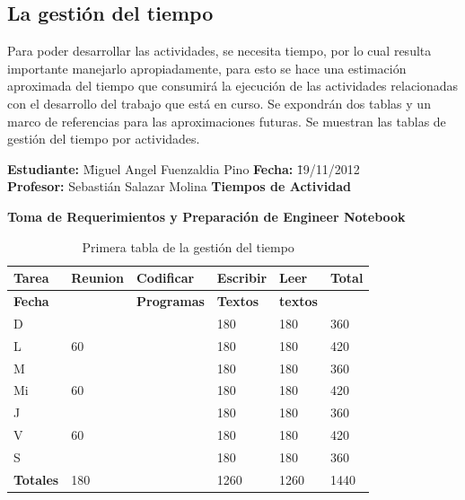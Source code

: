 \documentclass[a4paper,12pt,openany,oneside]{book}
\begin{document}
\subsection{La gestión del tiempo}
Para poder desarrollar las actividades, se necesita tiempo, por lo cual resulta importante manejarlo apropiadamente, para esto se hace una estimación aproximada del tiempo que consumirá la ejecución de las actividades relacionadas con el desarrollo del trabajo que está en curso. Se expondrán dos tablas y un marco de referencias para las aproximaciones futuras. Se muestran las tablas de gestión del tiempo por actividades.
\begin{table}[!ht]
\begin{tabbing}
\textbf{Estudiante:} \= Miguel Angel Fuenzaldia Pino \= \textbf{Fecha:} \= 19/11/2012\\
\textbf{Profesor:} \> Sebastián Salazar Molina \> \textbf{Tiempos de Actividad} \>  \\
\end{tabbing}
\textbf{Toma de Requerimientos y Preparación de Engineer Notebook}\\
\begin{tabular}{| l | l | l | l | l | l |}
\hline
\textbf{Tarea} & \textbf{Reunion} & \textbf{Codificar} & \textbf{Escribir} & \textbf{Leer} & \textbf{Total} \\
\hline
\textbf{Fecha} &                  & \textbf{Programas} & \textbf{Textos} & \textbf{textos} & \\
\hline
D  &    & & 180 & 180 & 360 \\
\hline
L  & 60 & & 180 & 180 & 420 \\
\hline
M  &    & & 180 & 180 & 360 \\
\hline
Mi & 60 & & 180 & 180 & 420 \\
\hline
J  &    & & 180 & 180 & 360 \\
\hline
V  & 60 & & 180 & 180 & 420 \\
\hline
S  &    & & 180 & 180 & 360 \\
\hline
\textbf{Totales} & 180 & & 1260 & 1260 & 1440 \\
\hline
\end{tabular}
\caption{Primera tabla de la gestión del tiempo}
\end{table}
\end{document}

